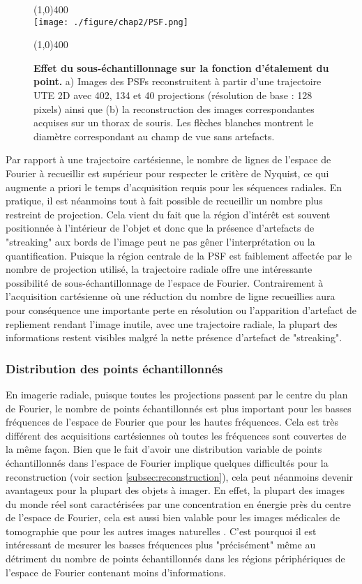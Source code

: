 \begin{figure}[h]
\centering
\line(1,0){400} \\
\texttt{[image: ./figure/chap2/PSF.png]}
\caption[Effet du sous-échantillonnage sur la fonction d'étalement du point.]{\label{fig:PSF} \textbf{Effet du sous-échantillonnage sur la fonction d'étalement du point.} a) Images des PSFs reconstruitent à partir d'une trajectoire UTE 2D avec 402, 134 et 40 projections (résolution de base : 128 pixels) ainsi que (b) la reconstruction des images correspondantes acquises sur un thorax de souris. Les flèches blanches montrent le diamètre correspondant au champ de vue sans artefacts.}
\line(1,0){400} \\
\end{figure}

Par rapport à une trajectoire cartésienne, le nombre de lignes de l'espace de Fourier à recueillir est supérieur pour respecter le critère de Nyquist, ce qui augmente a priori le temps d'acquisition requis pour les séquences radiales. En pratique, il est néanmoins tout à fait possible de recueillir un nombre plus restreint de projection. Cela vient du fait que la région d'intérêt est souvent positionnée à l'intérieur de l'objet et donc que la présence d'artefacts de "streaking" aux bords de l'image peut ne pas gêner l'interprétation ou la quantification. Puisque la région centrale de la PSF est faiblement affectée par le nombre de projection utilisé, la trajectoire radiale offre une intéressante possibilité de sous-échantillonnage de l'espace de Fourier. Contrairement à l'acquisition cartésienne où une réduction du nombre de ligne recueillies aura pour conséquence une importante perte en résolution ou l'apparition d'artefact de repliement rendant l'image inutile, avec une trajectoire radiale, la plupart des informations restent visibles malgré la nette présence d'artefact de "streaking".

\subsubsection{Distribution des points échantillonnés}

En imagerie radiale, puisque toutes les projections passent par le centre du plan de Fourier, le nombre de points échantillonnés est plus important pour les basses fréquences de l'espace de Fourier que pour les hautes fréquences. Cela est très différent des acquisitions cartésiennes où toutes les fréquences sont couvertes de la même façon. Bien que le fait d'avoir une distribution variable de points échantillonnés dans l'espace de Fourier implique quelques difficultés pour la reconstruction (voir section \ref{subsec:reconstruction}), cela peut néanmoins devenir avantageux pour la plupart des objets à imager. En effet, la plupart des images du monde réel sont caractérisées par une concentration en énergie près du centre de l'espace de Fourier, cela est aussi bien valable pour les images médicales de tomographie que pour les autres images naturelles \cite{srivastava2003advances}. C'est pourquoi il est intéressant de mesurer les basses fréquences plus "précisément" même au détriment du nombre de points échantillonnés dans les régions périphériques de l'espace de Fourier contenant moins d'informations. 

